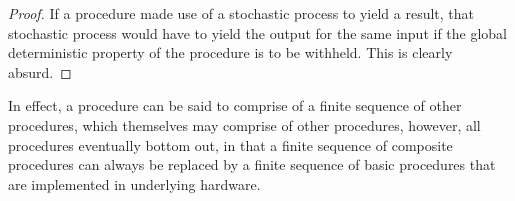 \begin{proof} If a procedure made use of a stochastic process to yield a
result, that stochastic process would have to yield the output for the same
input if the global deterministic property of the procedure is to be withheld.
This is clearly absurd.\end{proof}

In effect, a procedure can be said to comprise of a finite sequence of other
procedures, which themselves may comprise of other procedures, however, all
procedures eventually bottom out, in that a finite sequence of composite
procedures can always be replaced by a finite sequence of basic procedures that
are implemented in underlying hardware.








